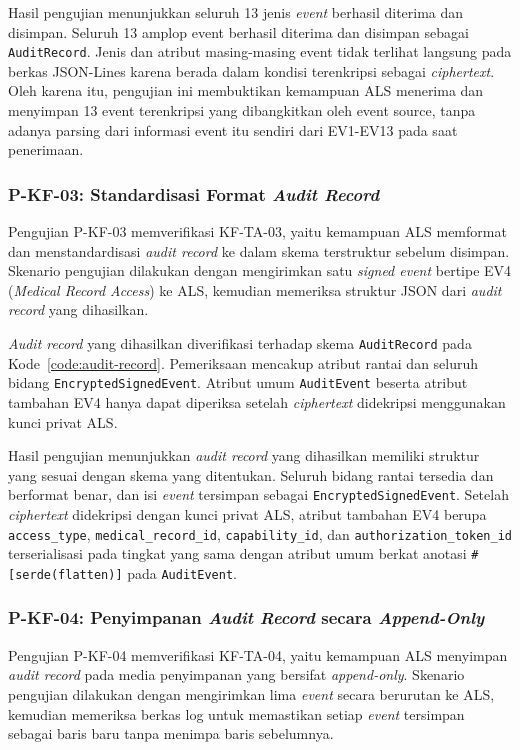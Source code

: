 Hasil pengujian menunjukkan seluruh 13 jenis \textit{event} berhasil diterima dan disimpan. Seluruh 13 amplop event berhasil diterima dan disimpan sebagai \texttt{AuditRecord}. Jenis dan atribut masing-masing event tidak terlihat langsung pada berkas JSON-Lines karena berada dalam kondisi terenkripsi sebagai \textit{ciphertext}. Oleh karena itu, pengujian ini membuktikan kemampuan ALS menerima dan menyimpan 13 event terenkripsi yang dibangkitkan oleh event source, tanpa adanya parsing dari informasi event itu sendiri dari EV1-EV13 pada saat penerimaan.

\subsubsection{P-KF-03: Standardisasi Format \textit{Audit Record}}

Pengujian P-KF-03 memverifikasi KF-TA-03, yaitu kemampuan ALS memformat dan menstandardisasi \textit{audit record} ke dalam skema terstruktur sebelum disimpan. Skenario pengujian dilakukan dengan mengirimkan satu \textit{signed event} bertipe EV4 (\textit{Medical Record Access}) ke ALS, kemudian memeriksa struktur JSON dari \textit{audit record} yang dihasilkan.

\textit{Audit record} yang dihasilkan diverifikasi terhadap skema \texttt{AuditRecord} pada Kode~\ref{code:audit-record}. Pemeriksaan mencakup atribut rantai dan seluruh bidang \texttt{EncryptedSignedEvent}. Atribut umum \texttt{AuditEvent} beserta atribut tambahan EV4 hanya dapat diperiksa setelah \textit{ciphertext} didekripsi menggunakan kunci privat ALS.

Hasil pengujian menunjukkan \textit{audit record} yang dihasilkan memiliki
struktur yang sesuai dengan skema yang ditentukan. Seluruh bidang rantai
tersedia dan berformat benar, dan isi \textit{event} tersimpan sebagai
\texttt{EncryptedSignedEvent}. Setelah \textit{ciphertext} didekripsi dengan
kunci privat ALS, atribut tambahan EV4 berupa \texttt{access\_type},
\texttt{medical\_record\_id}, \texttt{capability\_id}, dan
\texttt{authorization\_token\_id} terserialisasi pada tingkat yang sama dengan
atribut umum berkat anotasi \texttt{\#[serde(flatten)]} pada
\texttt{AuditEvent}. 

\subsubsection{P-KF-04: Penyimpanan \textit{Audit Record} secara \textit{Append-Only}}

Pengujian P-KF-04 memverifikasi KF-TA-04, yaitu kemampuan ALS menyimpan \textit{audit record} pada media penyimpanan yang bersifat \textit{append-only}. Skenario pengujian dilakukan dengan mengirimkan lima \textit{event} secara berurutan ke ALS, kemudian memeriksa berkas log untuk memastikan setiap \textit{event} tersimpan sebagai baris baru tanpa menimpa baris sebelumnya.


